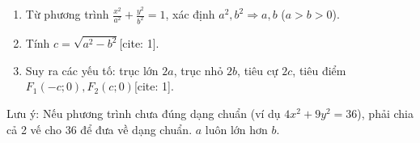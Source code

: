 \begin{enumerate}
\item Từ phương trình $\frac{x^2}{a^2} + \frac{y^2}{b^2} = 1$, xác định $a^2, b^2 \Rightarrow a, b$ ($a > b > 0$).
\item Tính $c = \sqrt{a^2 - b^2}$[cite: 1].
\item Suy ra các yếu tố: trục lớn $2a$, trục nhỏ $2b$, tiêu cự $2c$, tiêu điểm $F_1(-c; 0), F_2(c; 0)$[cite: 1].
\end{enumerate}
Lưu ý: Nếu phương trình chưa đúng dạng chuẩn (ví dụ $4x^2 + 9y^2 = 36$), phải chia cả 2 vế cho 36 để đưa về dạng chuẩn. $a$ luôn lớn hơn $b$.
